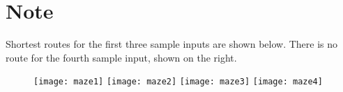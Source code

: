 \section*{Note}
Shortest routes for the first three sample inputs are shown below. There is no route for the fourth sample input, shown on the right.
\begin{figure}[h]
  \texttt{[image: maze1]} \hskip 1cm
  \texttt{[image: maze2]} \hskip 1cm
  \texttt{[image: maze3]} \hskip 1cm
  \texttt{[image: maze4]}
\end{figure}
